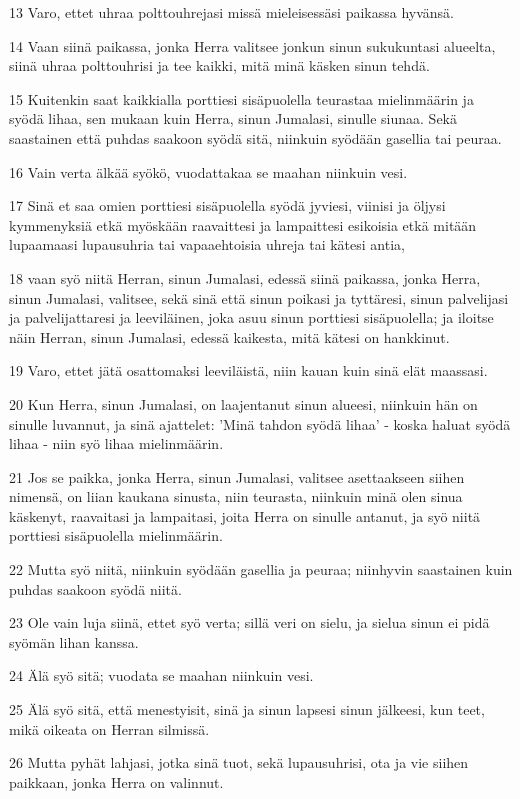 \par 13 Varo, ettet uhraa polttouhrejasi missä mieleisessäsi paikassa hyvänsä.
\par 14 Vaan siinä paikassa, jonka Herra valitsee jonkun sinun sukukuntasi alueelta, siinä uhraa polttouhrisi ja tee kaikki, mitä minä käsken sinun tehdä.
\par 15 Kuitenkin saat kaikkialla porttiesi sisäpuolella teurastaa mielinmäärin ja syödä lihaa, sen mukaan kuin Herra, sinun Jumalasi, sinulle siunaa. Sekä saastainen että puhdas saakoon syödä sitä, niinkuin syödään gasellia tai peuraa.
\par 16 Vain verta älkää syökö, vuodattakaa se maahan niinkuin vesi.
\par 17 Sinä et saa omien porttiesi sisäpuolella syödä jyviesi, viinisi ja öljysi kymmenyksiä etkä myöskään raavaittesi ja lampaittesi esikoisia etkä mitään lupaamaasi lupausuhria tai vapaaehtoisia uhreja tai kätesi antia,
\par 18 vaan syö niitä Herran, sinun Jumalasi, edessä siinä paikassa, jonka Herra, sinun Jumalasi, valitsee, sekä sinä että sinun poikasi ja tyttäresi, sinun palvelijasi ja palvelijattaresi ja leeviläinen, joka asuu sinun porttiesi sisäpuolella; ja iloitse näin Herran, sinun Jumalasi, edessä kaikesta, mitä kätesi on hankkinut.
\par 19 Varo, ettet jätä osattomaksi leeviläistä, niin kauan kuin sinä elät maassasi.
\par 20 Kun Herra, sinun Jumalasi, on laajentanut sinun alueesi, niinkuin hän on sinulle luvannut, ja sinä ajattelet: 'Minä tahdon syödä lihaa' - koska haluat syödä lihaa - niin syö lihaa mielinmäärin.
\par 21 Jos se paikka, jonka Herra, sinun Jumalasi, valitsee asettaakseen siihen nimensä, on liian kaukana sinusta, niin teurasta, niinkuin minä olen sinua käskenyt, raavaitasi ja lampaitasi, joita Herra on sinulle antanut, ja syö niitä porttiesi sisäpuolella mielinmäärin.
\par 22 Mutta syö niitä, niinkuin syödään gasellia ja peuraa; niinhyvin saastainen kuin puhdas saakoon syödä niitä.
\par 23 Ole vain luja siinä, ettet syö verta; sillä veri on sielu, ja sielua sinun ei pidä syömän lihan kanssa.
\par 24 Älä syö sitä; vuodata se maahan niinkuin vesi.
\par 25 Älä syö sitä, että menestyisit, sinä ja sinun lapsesi sinun jälkeesi, kun teet, mikä oikeata on Herran silmissä.
\par 26 Mutta pyhät lahjasi, jotka sinä tuot, sekä lupausuhrisi, ota ja vie siihen paikkaan, jonka Herra on valinnut.
